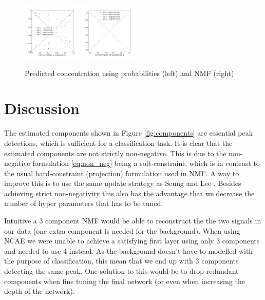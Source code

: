 \documentclass{article}
\begin{document}
\begin{figure}[H]
	\includegraphics[width=0.25\textwidth]{DNN_pred_conc_prob_2.png} \hspace*{-.5cm}
	\includegraphics[width=0.25\textwidth]{nmf_pred_conc_2.png}
	\caption{Predicted concentration using probabilities (left) and NMF (right)}
	\label{fig:comparison}
\end{figure}
\section{Discussion}
\label{sec:discussion}
The estimated components shown in Figure \ref{fig:components} are essential peak detections, which is sufficient for a classification task. It is clear that the estimated components are not strictly non-negative. This is due to the non-negative formulation \eqref{eq:non_neg} being a soft-constraint, which is in contrast to the usual hard-constraint (projection) formulation used in NMF. A way to improve this is to use the same update strategy as Seung and Lee \cite{Seung1999}. Besides achieving strict non-negativity this also has the advantage that we decrease the number of hyper parameters that has to be tuned.

Intuitive a 3 component NMF would be able to reconstruct the the two signals in our data (one extra component is needed for the background). When using NCAE we were unable to achieve a satisfying first layer using only 3 components and needed to use 4 instead. As the background doesn't have to modelled with the purpose of classification, this mean that we end up with 3 components detecting the same peak. One solution to this would be to drop redundant components when fine tuning the final network (or even when increasing the depth of the network).
\end{document}
